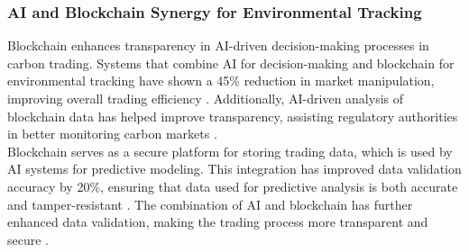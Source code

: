 \documentclass[preprint,12pt]{elsarticle}
\begin{document}
\subsubsection{AI and Blockchain Synergy for Environmental Tracking}
Blockchain enhances transparency in AI-driven decision-making processes in carbon trading. Systems that combine AI for decision-making and blockchain for environmental tracking have shown a 45\% reduction in market manipulation, improving overall trading efficiency \citep{authorp2021ai}. Additionally, AI-driven analysis of blockchain data has helped improve transparency, assisting regulatory authorities in better monitoring carbon markets \citep{authors2020optimizing}.\\
Blockchain serves as a secure platform for storing trading data, which is used by AI systems for predictive modeling. This integration has improved data validation accuracy by 20\%, ensuring that data used for predictive analysis is both accurate and tamper-resistant \citep{authorv2022ai}. The combination of AI and blockchain has further enhanced data validation, making the trading process more transparent and secure \citep{authory2021improving}. 
\end{document}
